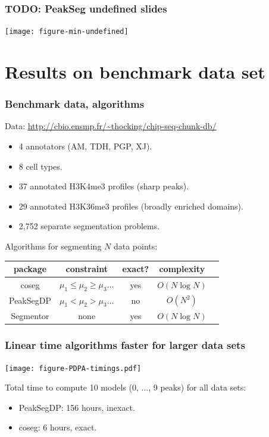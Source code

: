 \documentclass{beamer}
\begin{document}
\begin{frame}
  \frametitle{TODO: PeakSeg undefined slides}
  \texttt{[image: figure-min-undefined]}
\end{frame}

\section{Results on benchmark data set}

\begin{frame}
  \frametitle{Benchmark data, algorithms}

  Data: \url{http://cbio.ensmp.fr/~thocking/chip-seq-chunk-db/}
  \begin{itemize}
  \item 4 annotators (AM, TDH, PGP, XJ).
  \item 8 cell types.
  \item 37 annotated H3K4me3 profiles (sharp peaks).
  \item 29 annotated H3K36me3 profiles (broadly enriched domains).
  \item 2,752 separate segmentation problems.
  \end{itemize}

  Algorithms for segmenting $N$ data points:
  \begin{center}
  \begin{tabular}{ccccc}
    package & constraint & exact? & complexity \\
    \hline
    coseg & $\mu_1 \leq \mu_2 \geq \mu_3 \dots$ & yes & $O(N\log N)$ \\
    PeakSegDP & $\mu_1 < \mu_2 > \mu_3 \dots$ & no & $O(N^2)$\\
    Segmentor & none & yes & $O(N\log N)$
  \end{tabular}
  \end{center}
\end{frame}

\begin{frame}
  \frametitle{Linear time algorithms faster for larger data sets}
  \texttt{[image: figure-PDPA-timings.pdf]}

  Total time to compute 10 models (0, ..., 9 peaks) for all data sets:
  \begin{itemize}
  \item PeakSegDP: 156 hours, inexact.
  \item coseg: 6 hours, exact.
  \end{itemize}
\end{frame}
\end{document}
